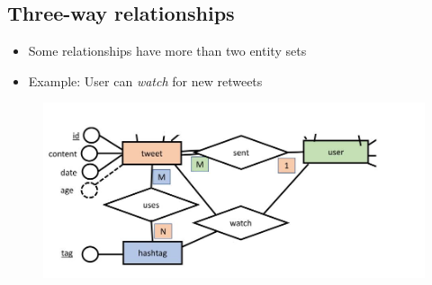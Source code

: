 \documentclass[conference]{IEEEtran}
\begin{document}
\pagebreak

\subsection{Three-way relationships}

\begin{itemize}
    \item Some relationships have more than two entity sets
    \item Example: User can \textit{watch} for new retweets
\end{itemize}
\begin{figure} [h!]
    \centering
    \includegraphics[scale=0.4]{Ex13.JPG}
\end{figure}


\end{document}
